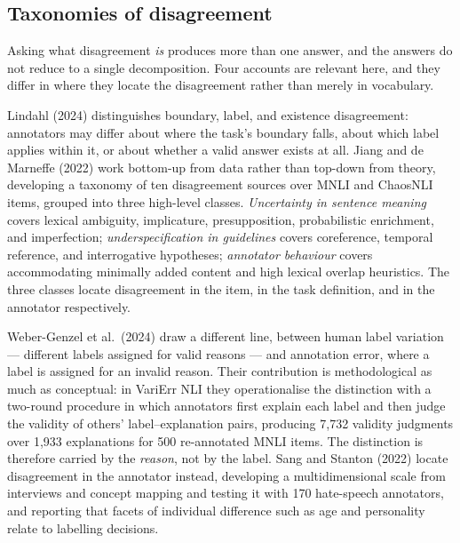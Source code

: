 %
%

\subsection{Taxonomies of disagreement}

Asking what disagreement \emph{is} produces more than one answer, and the answers do not reduce
to a single decomposition. Four accounts are relevant here, and they differ in where they locate
the disagreement rather than merely in vocabulary.

Lindahl (2024) distinguishes boundary, label, and existence disagreement: annotators may differ
about where the task's boundary falls, about which label applies within it, or about whether a
valid answer exists at all. Jiang and de Marneffe (2022) work bottom-up from data rather than
top-down from theory, developing a taxonomy of ten disagreement sources over MNLI and ChaosNLI
items, grouped into three high-level classes. \emph{Uncertainty in sentence meaning} covers
lexical ambiguity, implicature, presupposition, probabilistic enrichment, and imperfection;
\emph{underspecification in guidelines} covers coreference, temporal reference, and interrogative
hypotheses; \emph{annotator behaviour} covers accommodating minimally added content and high
lexical overlap heuristics. The three classes locate disagreement in the item, in the task
definition, and in the annotator respectively.

Weber-Genzel et al.\ (2024) draw a different line, between human label variation --- different
labels assigned for valid reasons --- and annotation error, where a label is assigned for an
invalid reason. Their contribution is methodological as much as conceptual: in VariErr NLI they
operationalise the distinction with a two-round procedure in which annotators first explain each
label and then judge the validity of others' label--explanation pairs, producing 7,732 validity
judgments over 1,933 explanations for 500 re-annotated MNLI items. The distinction is therefore
carried by the \emph{reason}, not by the label. Sang and Stanton (2022) locate disagreement in
the annotator instead, developing a multidimensional scale from interviews and concept mapping
and testing it with 170 hate-speech annotators, and reporting that facets of individual
difference such as age and personality relate to labelling decisions.

